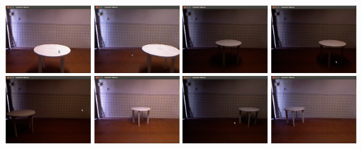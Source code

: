 \begin{center}
	\includegraphics[width=0.240\textwidth]{figures/experiencia/exp1.png}
	\includegraphics[width=0.240\textwidth]{figures/experiencia/exp2.png}
	\includegraphics[width=0.240\textwidth]{figures/experiencia/exp3.png}
	\includegraphics[width=0.240\textwidth]{figures/experiencia/exp4.png} \\
	\includegraphics[width=0.240\textwidth]{figures/experiencia/exp5.png}
	\includegraphics[width=0.240\textwidth]{figures/experiencia/exp6.png}
	\includegraphics[width=0.240\textwidth]{figures/experiencia/exp7.png}
	\includegraphics[width=0.240\textwidth]{figures/experiencia/exp8.png}
	\label{fig:exp_posicoesmesa}
\end{center}


